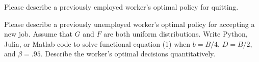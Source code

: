 \medskip
{} Please describe a previously employed worker's optimal policy for quitting.
\medskip

 Please describe a previously unemployed worker's optimal policy for accepting a new job.
\medskip
{}  Assume that $G$ and $F$ are both uniform distributions.  Write Python, Julia, 
or Matlab code to solve functional equation (1) when $b = B/4$,  $D= B/2$, and $\beta = .95$. Describe the worker's
optimal decisions quantitatively.

